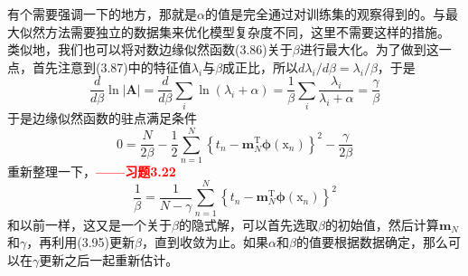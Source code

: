\documentclass[b5paper]{book}
\numberwithin{equation}{chapter}
\newcommand {\bx} {\boldsymbol{\mathrm{x}}}
\newcommand {\rmT} {\mathrm{T}}
\newcommand {\bfphi} {\boldsymbol{\phi}}
\begin{document}
{	\indent 有个需要强调一下的地方，那就是$\alpha$的值是完全通过对训练集的观察得到的。与最大似然方法需要独立的数据集来优化模型复杂度不同，这里不需要这样的措施。\\
	\indent 类似地，我们也可以将对数边缘似然函数(3.86)关于$\beta$进行最大化。为了做到这一点，首先注意到(3.87)中的特征值$\lambda_i$与$\beta$成正比，所以$d\lambda_i/d\beta = \lambda_i/\beta$，于是
	\begin{equation}
		\frac{d}{d\beta} \ln |\mathbf{A}| = \frac{d}{d\beta}\sum_{i} \ln (\lambda_i + \alpha)=\frac{1}{\beta}\sum_{i}\frac{\lambda_i}{\lambda_i+\alpha}=\frac{\gamma}{\beta}
	\end{equation}
	于是边缘似然函数的驻点满足条件
	\begin{equation}
		0 = \frac{N}{2\beta} - \frac{1}{2}\sum_{n=1}^N \left\{t_n-\mathbf{m}_N^{\rmT}\bfphi(\bx_n)\right\}^2 - \frac{\gamma}{2\beta}
	\end{equation}
	重新整理一下，\textcolor{red}{\textbf{——习题3.22}}
	\begin{equation}
		\frac{1}{\beta}=\frac{1}{N-\gamma}\sum_{n=1}^N \left\{t_n - \mathbf{m}_N^{\rmT}\bfphi(\bx_n)\right\}^2
	\end{equation}
	和以前一样，这又是一个关于$\beta$的隐式解，可以首先选取$\beta$的初始值，然后计算$\mathbf{m}_N$和$\gamma$，再利用(3.95)更新$\beta$，直到收敛为止。如果$\alpha$和$\beta$的值要根据数据确定，那么可以在$\gamma$更新之后一起重新估计。
	}
\end{document}
